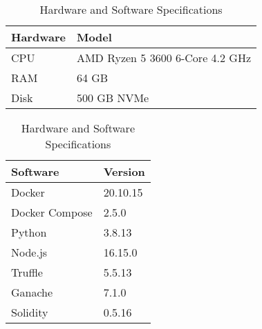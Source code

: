 \begin{table}[!h]
    \begin{subtable}[h]{0.59\textwidth}
        \centering
        \begin{tabular}{l|l} \hline \hline
            Hardware & Model                                    \\ \hline \hline
            CPU      & AMD Ryzen 5 3600 6-Core 4.2 GHz          \\ \hline
            RAM      & 64 GB                                    \\ \hline
            Disk     & 500 GB NVMe                              \\ \hline
        \end{tabular}
        \caption{Hardware}
        \label{evaluation:hardware}
    \end{subtable}
    \hfill
    \begin{subtable}[h]{0.39\textwidth}
        \centering
        \begin{tabular}{l|l} \hline \hline
            Software            & Version               \\ \hline \hline
            Docker              & 20.10.15              \\ \hline
            Docker Compose      & 2.5.0                 \\ \hline
            Python              & 3.8.13               \\ \hline
            Node.js             & 16.15.0               \\ \hline
            Truffle             & 5.5.13               \\ \hline
            Ganache             & 7.1.0               \\ \hline
            Solidity            & 0.5.16               \\ \hline
        \end{tabular}
        \caption{Software}
        \label{evaluation:software}
     \end{subtable}
     \caption{Hardware and Software Specifications}
     \label{tab:temps}
\end{table}